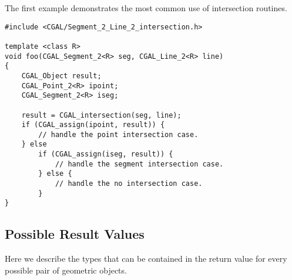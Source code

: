 \ccExample

The first example demonstrates the most common use of intersection routines.
\begin{verbatim}
#include <CGAL/Segment_2_Line_2_intersection.h>

template <class R>
void foo(CGAL_Segment_2<R> seg, CGAL_Line_2<R> line)
{
    CGAL_Object result;
    CGAL_Point_2<R> ipoint;
    CGAL_Segment_2<R> iseg;

    result = CGAL_intersection(seg, line);
    if (CGAL_assign(ipoint, result)) {
        // handle the point intersection case.
    } else
        if (CGAL_assign(iseg, result)) {
            // handle the segment intersection case.
        } else {
            // handle the no intersection case.
        }
}
\end{verbatim}




\subsection{Possible Result Values}
\label{all_intersection_results}

Here we describe the types that can be contained in the 
return value for every possible pair of geometric objects.

